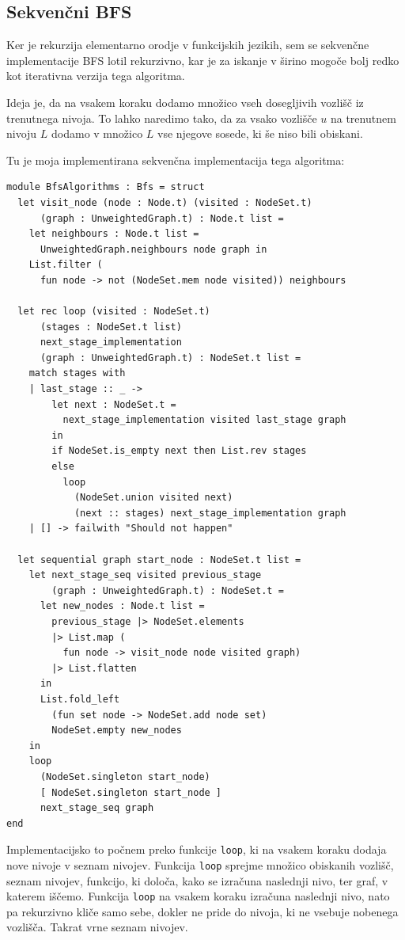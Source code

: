 \documentclass[mat1, tisk]{fmfdelo}
\begin{document}
\subsection{Sekvenčni BFS}

Ker je rekurzija elementarno orodje v funkcijskih jezikih, sem se sekvenčne implementacije BFS lotil rekurzivno, kar
je za iskanje v širino mogoče bolj redko kot iterativna verzija tega algoritma. 

Ideja je, da na vsakem koraku dodamo množico vseh dosegljivih vozlišč iz trenutnega nivoja. To lahko naredimo tako, da
za vsako vozlišče $u$ na trenutnem nivoju $L$ dodamo v množico $L$ vse njegove sosede, ki še niso bili obiskani.

Tu je moja implementirana sekvenčna implementacija tega algoritma:

\begin{lstlisting}[label=lst:bfs_sequential]
module BfsAlgorithms : Bfs = struct
  let visit_node (node : Node.t) (visited : NodeSet.t)
      (graph : UnweightedGraph.t) : Node.t list =
    let neighbours : Node.t list = 
      UnweightedGraph.neighbours node graph in
    List.filter (
      fun node -> not (NodeSet.mem node visited)) neighbours

  let rec loop (visited : NodeSet.t) 
      (stages : NodeSet.t list)
      next_stage_implementation
      (graph : UnweightedGraph.t) : NodeSet.t list =
    match stages with
    | last_stage :: _ ->
        let next : NodeSet.t =
          next_stage_implementation visited last_stage graph
        in
        if NodeSet.is_empty next then List.rev stages
        else
          loop
            (NodeSet.union visited next)
            (next :: stages) next_stage_implementation graph
    | [] -> failwith "Should not happen"

  let sequential graph start_node : NodeSet.t list =
    let next_stage_seq visited previous_stage
        (graph : UnweightedGraph.t) : NodeSet.t =
      let new_nodes : Node.t list =
        previous_stage |> NodeSet.elements
        |> List.map (
          fun node -> visit_node node visited graph)
        |> List.flatten
      in
      List.fold_left
        (fun set node -> NodeSet.add node set)
        NodeSet.empty new_nodes
    in
    loop
      (NodeSet.singleton start_node)
      [ NodeSet.singleton start_node ]
      next_stage_seq graph
end

\end{lstlisting}


Implementacijsko to počnem preko funkcije \texttt{loop}, ki na vsakem koraku dodaja nove nivoje v seznam nivojev.
Funkcija \texttt{loop} sprejme množico obiskanih vozlišč, seznam nivojev, funkcijo, ki določa, kako se izračuna
naslednji nivo, ter graf, v katerem iščemo. Funkcija \texttt{loop} na vsakem koraku izračuna naslednji nivo, nato pa
rekurzivno kliče samo sebe, dokler ne pride do nivoja, ki ne vsebuje nobenega vozlišča. Takrat vrne seznam nivojev.
\end{document}
